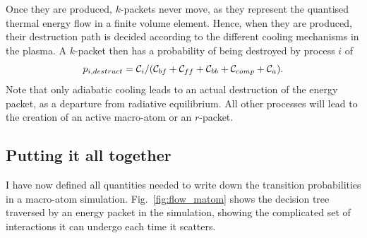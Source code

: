 Once they are produced, $k$-packets never move, as they represent the quantised
thermal energy flow in a finite volume element. Hence, when they are produced,
their destruction path is decided according to the different cooling mechanisms
in the plasma. A $k$-packet then has a probability of being destroyed by process $i$ of
\begin{equation}
p_{i,destruct} = {\cal C}_i / ({\cal C}_{bf} + {\cal C}_{ff} + {\cal C}_{bb} + {\cal C}_{comp} + {\cal C}_a).
\end{equation}
Note that only adiabatic cooling leads to an actual destruction of the energy packet,
as a departure from radiative equilibrium. All other processes will lead to the 
creation of an active macro-atom or an $r$-packet.



\subsection{Putting it all together}

I have now defined all quantities needed to write down the transition 
probabilities in a macro-atom simulation. Fig.~\ref{fig:flow_matom}
shows the decision tree traversed by an energy packet in the simulation,
showing the complicated set of interactions it can undergo each time it 
scatters.

